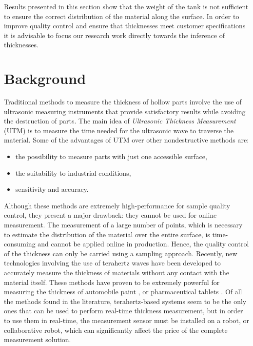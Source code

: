 %
Results presented in this section show that the weight of the tank is not sufficient to ensure the correct distribution of the material along the surface. In order to improve quality control and ensure that thicknesses meet customer specifications it is advisable to focus our research work directly towards the inference of thicknesses.

\section{Background} \label{Background}

Traditional methods to measure the thickness of hollow parts involve the use of ultrasonic measuring instruments that provide satisfactory results while avoiding the destruction of parts. The main idea of \textit{Ultrasonic Thickness Measurement} (UTM) is to measure the time needed for the ultrasonic wave to traverse the material. Some of the advantages of UTM over other nondestructive methods are:
\begin{itemize}
    \item the possibility to measure parts with just one accessible surface,
    \item the suitability to industrial conditions,
    \item sensitivity and accuracy.
\end{itemize}
 
Although these methods are extremely high-performance for sample quality control, they present a major drawback: they cannot be used for online measurement. The measurement of a large number of points, which is necessary to estimate the distribution of the material over the entire surface, is time-consuming and cannot be applied online in production. Hence, the quality control of the thickness can only be carried using a sampling approach. Recently, new technologies involving the use of terahertz waves have been developed to accurately measure the thickness of materials without any contact with the material itself. These methods have proven to be extremely powerful for measuring the thickness of automobile paint \citep{su2014terahertz,krimi2016highly}, or pharmaceutical tablets \citep{may2011terahertz}. Of all the methods found in the literature, terahertz-based systems seem to be the only ones that can be used to perform real-time thickness measurement, but in order to use them in real-time, the measurement sensor must be installed on a robot, or collaborative robot, which can significantly affect the price of the complete measurement solution.

